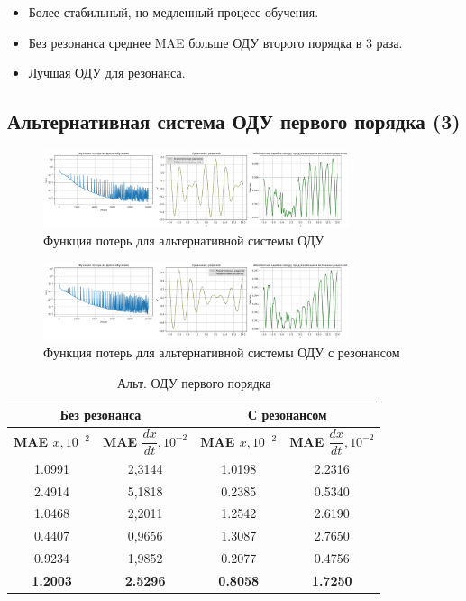 \documentclass[12pt,a4paper]{article}
\begin{document}
\begin{itemize}
    \item Более стабильный, но медленный процесс обучения.
    \item Без резонанса среднее MAE больше ОДУ второго порядка в 3 раза.
    \item Лучшая ОДУ для резонанса.
\end{itemize}
\newpage

\subsection{Альтернативная система ОДУ первого порядка (3)}

\begin{figure}[H]
    \centering
    \includegraphics[width=0.8\textwidth]{images/Loss&x_alt_ODE.png}
    \caption{Функция потерь для альтернативной системы ОДУ}
    \label{fig:loss_alt}
\end{figure}

\begin{figure}[H]
    \centering
    \includegraphics[width=0.8\textwidth]{images/Loss&x_alt_ODE_resonance.png}
    \caption{Функция потерь для альтернативной системы ОДУ с резонансом}
    \label{fig:loss_alt_resonance}
\end{figure}

\begin{table}[h!]
    \centering
    \begin{tabular}{|c|c|c|c|}
    \hline
    \multicolumn{2}{|c|}{\textbf{Без резонанса}} & \multicolumn{2}{|c|}{\textbf{С резонансом}} \\
    \hline
    \textbf{MAE $x, 10^{-2}$} & \textbf{MAE $\dfrac{dx}{dt}, 10^{-2}$} & \textbf{MAE $x, 10^{-2}$} & \textbf{MAE $\dfrac{dx}{dt}, 10^{-2}$} \\
    \hline
    1.0991 & 2,3144 & 1.0198 & 2.2316 \\
    2.4914 & 5,1818 & 0.2385 & 0.5340 \\
    1.0468 & 2,2011 & 1.2542 & 2.6190 \\
    0.4407 & 0,9656 & 1.3087 & 2.7650 \\
    0.9234 & 1,9852 & 0.2077 & 0.4756 \\
    \hline
    \textbf{1.2003} & \textbf{2.5296} & \textbf{0.8058} & \textbf{1.7250} \\
    \hline
    \end{tabular}
    \caption{Альт. ОДУ первого порядка}
\end{table}
\end{document}
